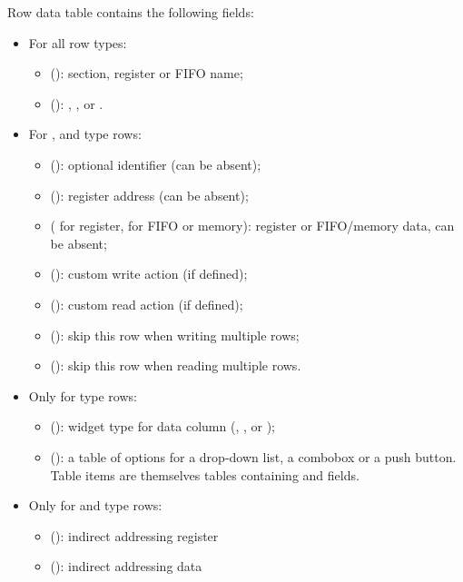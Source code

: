 \documentclass[a4paper,12pt,twoside,extrafontsizes]{memoir}
\begin{document}
\begin{funcremarks}
	Row data table contains the following fields:
	\begin{itemize}
		\item For all row types:
		\begin{itemize}
			\item {} (): section, register or FIFO name;
			\item {} (): , ,  or .
		\end{itemize}
		\item For ,  and  type rows:
		\begin{itemize}
			\item {} (): optional identifier (can be absent);
			\item {} (): register address (can be absent);
			\item {} ( for register,  for FIFO or memory): register or FIFO/memory data, can be absent;
			\item {} (): custom write action (if defined);
			\item {} (): custom read action (if defined);
			\item {} (): skip this row when writing multiple rows;
			\item {} (): skip this row when reading multiple rows.
		\end{itemize}
		\item Only for  type rows:
		\begin{itemize}
			\item {} (): widget type for data column (, ,  or );
			\item {} (): a table of options for a drop-down list, a combobox or a push button. Table items are themselves tables containing  and  fields.
		\end{itemize}
		\item Only for  and  type rows:
		\begin{itemize}
			\item {} (): indirect addressing register
			\item {} (): indirect addressing data
		\end{itemize}
	\end{itemize}
\end{funcremarks}
\end{document}

